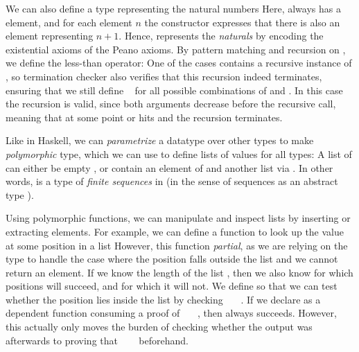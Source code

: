 We can also define a type representing the natural numbers
Here, \bN{} always has a  element, and for each element $n$ the constructor  expresses that there is also an element representing $n + 1$. Hence, \bN{} represents the \textit{naturals} by encoding the existential axioms of the Peano axioms. By pattern matching and recursion on \bN{}, we define the less-than operator:
One of the cases contains a recursive instance of \bN{}, so termination checker also verifies that this recursion indeed terminates, ensuring that we still define \   for all possible combinations of  and . %
In this case the recursion is valid, since both arguments decrease before the recursive call, meaning that at some point  or  hits  and the recursion terminates.

Like in Haskell, we can \emph{parametrize} a datatype over other types to make \emph{polymorphic} type, which we can use to define lists of values for all types:
A list of  can either be empty \AIC{[]}, or contain an element of  and another list via . In other words,  is a type of \emph{finite sequences} in  (in the sense of sequences as an abstract type \cite{purelyfunctional}).

Using polymorphic functions, we can manipulate and inspect lists by inserting or extracting elements. For example, we can define a function to look up the value at some position  in a list
However, this function \emph{partial}, as we are relying on the type
to handle the case where the position falls outside the list and we cannot return an element. 
If we know the length of the list , then we also know for which positions  will succeed, and for which it will not. We define 
so that we can test whether the position  lies inside the list by checking \ \ \ . If we declare  as a dependent function consuming a proof of \ \ \ , then  always succeeds. However, this actually only moves the burden of checking whether the output was  afterwards to proving that \ \ \  beforehand.

